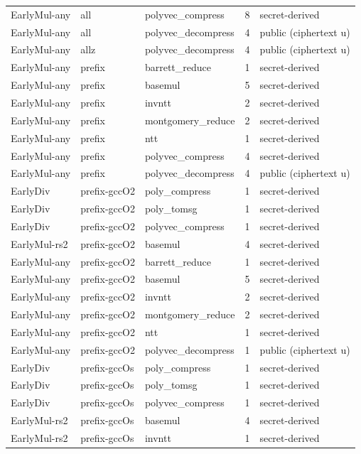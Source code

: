 \begin{tabular}{lllrl}
EarlyMul-any & all & polyvec\_compress & 8 & secret-derived \\
EarlyMul-any & all & polyvec\_decompress & 4 & public (ciphertext u) \\
EarlyMul-any & allz & polyvec\_decompress & 4 & public (ciphertext u) \\
EarlyMul-any & prefix & barrett\_reduce & 1 & secret-derived \\
EarlyMul-any & prefix & basemul & 5 & secret-derived \\
EarlyMul-any & prefix & invntt & 2 & secret-derived \\
EarlyMul-any & prefix & montgomery\_reduce & 2 & secret-derived \\
EarlyMul-any & prefix & ntt & 1 & secret-derived \\
EarlyMul-any & prefix & polyvec\_compress & 4 & secret-derived \\
EarlyMul-any & prefix & polyvec\_decompress & 4 & public (ciphertext u) \\
EarlyDiv & prefix-gccO2 & poly\_compress & 1 & secret-derived \\
EarlyDiv & prefix-gccO2 & poly\_tomsg & 1 & secret-derived \\
EarlyDiv & prefix-gccO2 & polyvec\_compress & 1 & secret-derived \\
EarlyMul-rs2 & prefix-gccO2 & basemul & 4 & secret-derived \\
EarlyMul-any & prefix-gccO2 & barrett\_reduce & 1 & secret-derived \\
EarlyMul-any & prefix-gccO2 & basemul & 5 & secret-derived \\
EarlyMul-any & prefix-gccO2 & invntt & 2 & secret-derived \\
EarlyMul-any & prefix-gccO2 & montgomery\_reduce & 2 & secret-derived \\
EarlyMul-any & prefix-gccO2 & ntt & 1 & secret-derived \\
EarlyMul-any & prefix-gccO2 & polyvec\_decompress & 1 & public (ciphertext u) \\
EarlyDiv & prefix-gccOs & poly\_compress & 1 & secret-derived \\
EarlyDiv & prefix-gccOs & poly\_tomsg & 1 & secret-derived \\
EarlyDiv & prefix-gccOs & polyvec\_compress & 1 & secret-derived \\
EarlyMul-rs2 & prefix-gccOs & basemul & 4 & secret-derived \\
EarlyMul-rs2 & prefix-gccOs & invntt & 1 & secret-derived \\

\end{tabular}
